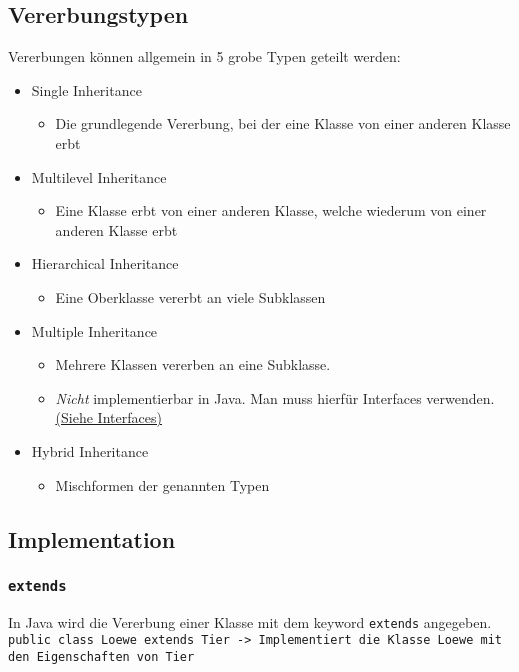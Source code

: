 \documentclass{article}
\begin{document}
	\subsection{Vererbungstypen}
	Vererbungen können allgemein in 5 grobe Typen geteilt werden:
	\begin{itemize}
		\item{Single Inheritance}
		\begin{itemize}
			\item{Die grundlegende Vererbung, bei der eine Klasse von einer anderen Klasse erbt}
		\end{itemize}
		\item{Multilevel Inheritance}
		\begin{itemize}
			\item{Eine Klasse erbt von einer anderen Klasse, welche wiederum von einer anderen Klasse erbt}
		\end{itemize}
		\item{Hierarchical Inheritance}
		\begin{itemize}
			\item{Eine Oberklasse vererbt an viele Subklassen}
		\end{itemize}
		\item{Multiple Inheritance}
		\begin{itemize}
			\item{Mehrere Klassen vererben an eine Subklasse.}
			\item{\textit{Nicht} implementierbar in Java. Man muss hierfür Interfaces verwenden. \hyperref[sub:interfaces]{\underline{(Siehe Interfaces)}}}
		\end{itemize}
		\item{Hybrid Inheritance}
		\begin{itemize}
			\item{Mischformen der genannten Typen}
		\end{itemize}
	\end{itemize}
	\subsection{Implementation}
	\subsubsection{\texttt{extends}}
	In Java wird die Vererbung einer Klasse mit dem keyword \texttt{extends} angegeben. \\
	\texttt{public class Loewe extends Tier -> Implementiert die Klasse Loewe mit den Eigenschaften von Tier}
\end{document}
